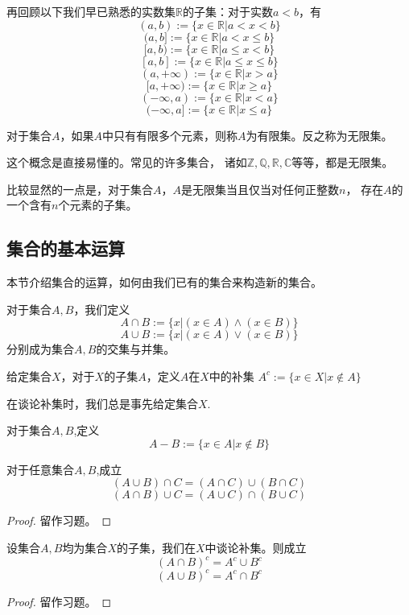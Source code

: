 \begin{example}[开区间与闭区间]
再回顾以下我们早已熟悉的实数集$\mathbb{R}$的子集：对于实数$a<b$，有
$$(a,b):=\{x\in\mathbb{R}|a<x<b\}$$
$$(a,b]:=\{x\in\mathbb{R}|a<x\leq b\}$$
$$[a,b):=\{x\in\mathbb{R}|a\leq x<b\}$$
$$[a,b]:=\{x\in\mathbb{R}|a\leq x\leq b\}$$
$$(a,+\infty):=\{x\in\mathbb{R}|x>a\}$$
$$[a,+\infty):=\{x\in\mathbb{R}|x\geq a\}$$
$$(-\infty,a):=\{x\in\mathbb{R}|x<a\}$$
$$(-\infty,a]:=\{x\in\mathbb{R}|x\leq a\}$$
\end{example}

\begin{definition}[有限集与无限集]
对于集合$A$，如果$A$中只有有限多个元素，则称$A$为有限集。反之称为无限集。
\end{definition}
这个概念是直接易懂的。常见的许多集合，
诸如$\mathbb{Z},\mathbb{Q},\mathbb{R},\mathbb{C}$等等，都是无限集。

比较显然的一点是，对于集合$A$，$A$是无限集当且仅当对任何正整数$n$，
存在$A$的一个含有$n$个元素的子集。

\subsection{集合的基本运算}

本节介绍集合的运算，如何由我们已有的集合来构造新的集合。
\begin{definition}[集合的交、并]
对于集合$A,B$，我们定义
$$A\cap B:=\{x|(x\in A)\wedge(x\in B)\}$$
$$A\cup B:=\{x|(x\in A)\vee(x\in B)\}$$
分别成为集合$A,B$的交集与并集。
\end{definition}

\begin{definition}[补集]
给定集合$X$，对于$X$的子集$A$，定义$A$在$X$中的补集
$A^c:=\{x\in X|x\not\in A\}$
\end{definition}
在谈论补集时，我们总是事先给定集合$X$.

\begin{definition}[差集]
对于集合$A,B$,定义
$$A-B:=\{x\in A|x\not\in B\}$$
\end{definition}

\begin{prop}[交、并的分配律]\label{set-fenpeilv}
对于任意集合$A,B$,成立
$$(A\cup B)\cap C=(A\cap C)\cup(B\cap C)$$
$$(A\cap B)\cup C=(A\cup C)\cap(B\cup C)$$
\end{prop}
\begin{proof}
留作习题。
\end{proof}

\begin{prop}[摩根律]\label{set-morgen}
设集合$A,B$均为集合$X$的子集，我们在$X$中谈论补集。则成立
$$(A\cap B)^c=A^c\cup B^c$$
$$(A\cup B)^c=A^c\cap B^c$$
\end{prop}
\begin{proof}
留作习题。
\end{proof}

